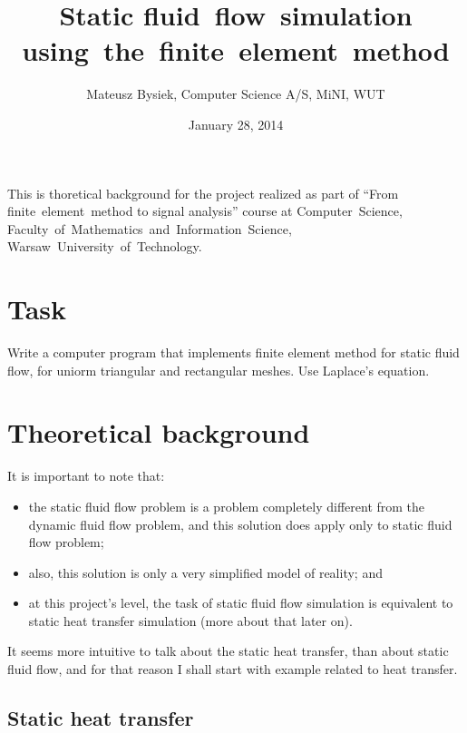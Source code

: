 \documentclass[a4paper,12pt]{article}
\begin{document}
\title{Static fluid~flow~simulation using~the~finite~element~method}
\date{January 28, 2014}
\author{Mateusz Bysiek, Computer Science A/S, MiNI, WUT}
\maketitle

\begin{footnotesize}

This is thoretical background for the project realized as part of ``From finite~element~method to signal analysis'' course at Computer~Science,
Faculty~of~Mathematics~and~Information~Science, Warsaw~University~of~Technology.

\end{footnotesize}

\section{Task}

Write a computer program that implements finite element method for static fluid flow, for uniorm triangular and
rectangular meshes. Use Laplace's equation.

\section{Theoretical background}

It is important to note that:

\begin{itemize}

  \item the static fluid flow problem is a problem completely different from the dynamic fluid flow problem, and this
  solution does apply only to static fluid flow problem;

  \item also, this solution is only a very simplified model of reality; and

  \item at this project's level, the task of static fluid flow simulation is equivalent to static heat transfer
  simulation (more about that later on).

\end{itemize}

It seems more intuitive to talk about the static heat transfer, than about static fluid flow, and for that reason I shall
start with example related to heat transfer.

\subsection{Static heat transfer}
\end{document}
